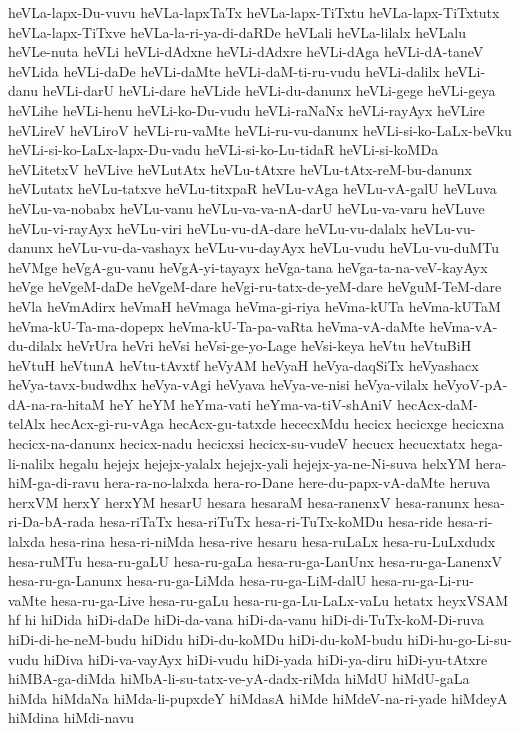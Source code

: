 {heVLa-lapx-Du-vuvu
heVLa-lapxTaTx
heVLa-lapx-TiTxtu
heVLa-lapx-TiTxtutx
heVLa-lapx-TiTxve
heVLa-la-ri-ya-di-daRDe
heVLali
heVLa-lilalx
heVLalu
heVLe-nuta
heVLi
heVLi-dAdxne
heVLi-dAdxre
heVLi-dAga
heVLi-dA-taneV
heVLida
heVLi-daDe
heVLi-daMte
heVLi-daM-ti-ru-vudu
heVLi-dalilx
heVLi-danu
heVLi-darU
heVLi-dare
heVLide
heVLi-du-danunx
heVLi-gege
heVLi-geya
heVLihe
heVLi-henu
heVLi-ko-Du-vudu
heVLi-raNaNx
heVLi-rayAyx
heVLire
heVLireV
heVLiroV
heVLi-ru-vaMte
heVLi-ru-vu-danunx
heVLi-si-ko-LaLx-beVku
heVLi-si-ko-LaLx-lapx-Du-vadu
heVLi-si-ko-Lu-tidaR
heVLi-si-koMDa
heVLitetxV
heVLive
heVLutAtx
heVLu-tAtxre
heVLu-tAtx-reM-bu-danunx
heVLutatx
heVLu-tatxve
heVLu-titxpaR
heVLu-vAga
heVLu-vA-galU
heVLuva
heVLu-va-nobabx
heVLu-vanu
heVLu-va-va-nA-darU
heVLu-va-varu
heVLuve
heVLu-vi-rayAyx
heVLu-viri
heVLu-vu-dA-dare
heVLu-vu-dalalx
heVLu-vu-danunx
heVLu-vu-da-vashayx
heVLu-vu-dayAyx
heVLu-vudu
heVLu-vu-duMTu
heVMge
heVgA-gu-vanu
heVgA-yi-tayayx
heVga-tana
heVga-ta-na-veV-kayAyx
heVge
heVgeM-daDe
heVgeM-dare
heVgi-ru-tatx-de-yeM-dare
heVguM-TeM-dare
heVla
heVmAdirx
heVmaH
heVmaga
heVma-gi-riya
heVma-kUTa
heVma-kUTaM
heVma-kU-Ta-ma-dopepx
heVma-kU-Ta-pa-vaRta
heVma-vA-daMte
heVma-vA-du-dilalx
heVrUra
heVri
heVsi
heVsi-ge-yo-Lage
heVsi-keya
heVtu
heVtuBiH
heVtuH
heVtunA
heVtu-tAvxtf
heVyAM
heVyaH
heVya-daqSiTx
heVyashacx
heVya-tavx-budwdhx
heVya-vAgi
heVyava
heVya-ve-nisi
heVya-vilalx
heVyoV-pA-dA-na-ra-hitaM
heY
heYM
heYma-vati
heYma-va-tiV-shAniV
hecAcx-daM-telAlx
hecAcx-gi-ru-vAga
hecAcx-gu-tatxde
hececxMdu
hecicx
hecicxge
hecicxna
hecicx-na-danunx
hecicx-nadu
hecicxsi
hecicx-su-vudeV
hecucx
hecucxtatx
hega-li-nalilx
hegalu
hejejx
hejejx-yalalx
hejejx-yali
hejejx-ya-ne-Ni-suva
helxYM
hera-hiM-ga-di-ravu
hera-ra-no-lalxda
hera-ro-Dane
here-du-papx-vA-daMte
heruva
herxVM
herxY
herxYM
hesarU
hesara
hesaraM
hesa-ranenxV
hesa-ranunx
hesa-ri-Da-bA-rada
hesa-riTaTx
hesa-riTuTx
hesa-ri-TuTx-koMDu
hesa-ride
hesa-ri-lalxda
hesa-rina
hesa-ri-niMda
hesa-rive
hesaru
hesa-ruLaLx
hesa-ru-LuLxdudx
hesa-ruMTu
hesa-ru-gaLU
hesa-ru-gaLa
hesa-ru-ga-LanUnx
hesa-ru-ga-LanenxV
hesa-ru-ga-Lanunx
hesa-ru-ga-LiMda
hesa-ru-ga-LiM-dalU
hesa-ru-ga-Li-ru-vaMte
hesa-ru-ga-Live
hesa-ru-gaLu
hesa-ru-ga-Lu-LaLx-vaLu
hetatx
heyxVSAM
hf
hi
hiDida
hiDi-daDe
hiDi-da-vana
hiDi-da-vanu
hiDi-di-TuTx-koM-Di-ruva
hiDi-di-he-neM-budu
hiDidu
hiDi-du-koMDu
hiDi-du-koM-budu
hiDi-hu-go-Li-su-vudu
hiDiva
hiDi-va-vayAyx
hiDi-vudu
hiDi-yada
hiDi-ya-diru
hiDi-yu-tAtxre
hiMBA-ga-diMda
hiMbA-li-su-tatx-ve-yA-dadx-riMda
hiMdU
hiMdU-gaLa
hiMda
hiMdaNa
hiMda-li-pupxdeY
hiMdasA
hiMde
hiMdeV-na-ri-yade
hiMdeyA
hiMdina
hiMdi-navu
}
